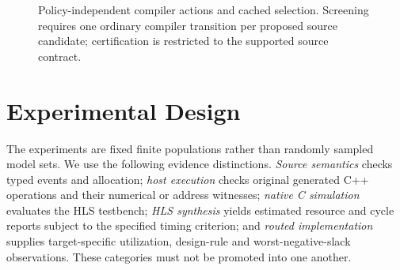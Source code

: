 \documentclass{article}
\begin{document}
\begin{figure}[t]
\centering
{}
\caption{Policy-independent compiler actions and cached selection. Screening requires one ordinary compiler transition per proposed source candidate; certification is restricted to the supported source contract.}
\label{fig:c2}
\end{figure}

\section{Experimental Design}
\label{sec:method}

The experiments are fixed finite populations rather than randomly sampled model sets. We use the following evidence distinctions. \emph{Source semantics} checks typed events and allocation; \emph{host execution} checks original generated C++ operations and their numerical or address witnesses; \emph{native C simulation} evaluates the HLS testbench; \emph{HLS synthesis} yields estimated resource and cycle reports subject to the specified timing criterion; and \emph{routed implementation} supplies target-specific utilization, design-rule and worst-negative-slack observations. These categories must not be promoted into one another.
\end{document}
